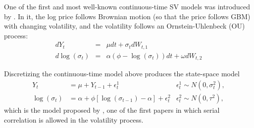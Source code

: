 One of the first and most well-known continuous-time SV models was introduced by \cite{hull1987pricing}. In it, the log price follows Brownian motion (so that the price follows GBM) with changing volatility, and the volatility follows an Ornstein-Uhlenbeck (OU) process:
	\begin{eqnarray*}
			d Y_t &=& \mu dt + \sigma_t dW_{t,1} \\
			d \log( \sigma_t ) &=& \alpha(\phi - \log(\sigma_t))dt + \omega dW_{t,2} 
	\end{eqnarray*}

Discretizing the continuous-time model above produces the state-space model
\begin{align*}
	Y_t 			&= \mu + Y_{t-1} + \epsilon_t^1 								 & \epsilon_t^1 \sim N(0, \sigma_t^2), \\
	\log(\sigma_t) &= \alpha + \phi \left[ \log(\sigma_{t-1}) - \alpha \right] + \epsilon_t^2  & \epsilon_t^2 \sim N(0, \tau^2),
\end{align*}
which is the model proposed by \cite{clark1973subordinated}, one of the first papers in which serial correlation is allowed in the volatility process.  



